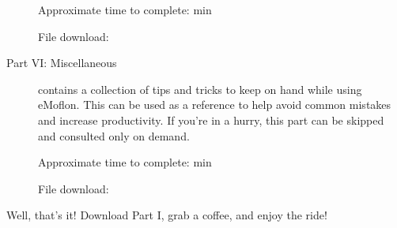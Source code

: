 \begin{description}
{\small Approximate time to complete: min
 
File download: \dlPartFive}

\item[Part VI: Miscellaneous] contains a collection of tips and tricks to keep on hand while using eMoflon. This can be used as a reference to help avoid common
mistakes and increase productivity. If you're in a hurry, this part can be skipped and consulted only on demand.

{\small Approximate time to complete: min
 
File download: \dlPartSix}

\end{description}

Well, that's it! Download Part I, grab a coffee, and enjoy the ride!
